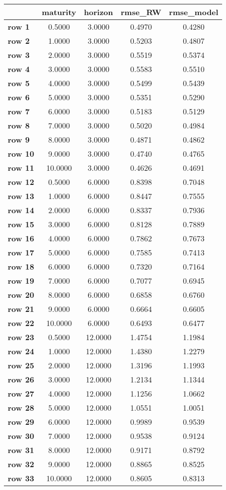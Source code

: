 \begin{tiny}\begin{tabular}{|l|c|c|c|c|}
\hline
&\textbf{maturity}&\textbf{horizon}&\textbf{rmse_RW}&\textbf{rmse_model}\\\hline
\textbf{row 1}&0.5000&3.0000&0.4970&0.4280\\\hline
\textbf{row 2}&1.0000&3.0000&0.5203&0.4807\\\hline
\textbf{row 3}&2.0000&3.0000&0.5519&0.5374\\\hline
\textbf{row 4}&3.0000&3.0000&0.5583&0.5510\\\hline
\textbf{row 5}&4.0000&3.0000&0.5499&0.5439\\\hline
\textbf{row 6}&5.0000&3.0000&0.5351&0.5290\\\hline
\textbf{row 7}&6.0000&3.0000&0.5183&0.5129\\\hline
\textbf{row 8}&7.0000&3.0000&0.5020&0.4984\\\hline
\textbf{row 9}&8.0000&3.0000&0.4871&0.4862\\\hline
\textbf{row 10}&9.0000&3.0000&0.4740&0.4765\\\hline
\textbf{row 11}&10.0000&3.0000&0.4626&0.4691\\\hline
\textbf{row 12}&0.5000&6.0000&0.8398&0.7048\\\hline
\textbf{row 13}&1.0000&6.0000&0.8447&0.7555\\\hline
\textbf{row 14}&2.0000&6.0000&0.8337&0.7936\\\hline
\textbf{row 15}&3.0000&6.0000&0.8128&0.7889\\\hline
\textbf{row 16}&4.0000&6.0000&0.7862&0.7673\\\hline
\textbf{row 17}&5.0000&6.0000&0.7585&0.7413\\\hline
\textbf{row 18}&6.0000&6.0000&0.7320&0.7164\\\hline
\textbf{row 19}&7.0000&6.0000&0.7077&0.6945\\\hline
\textbf{row 20}&8.0000&6.0000&0.6858&0.6760\\\hline
\textbf{row 21}&9.0000&6.0000&0.6664&0.6605\\\hline
\textbf{row 22}&10.0000&6.0000&0.6493&0.6477\\\hline
\textbf{row 23}&0.5000&12.0000&1.4754&1.1984\\\hline
\textbf{row 24}&1.0000&12.0000&1.4380&1.2279\\\hline
\textbf{row 25}&2.0000&12.0000&1.3196&1.1993\\\hline
\textbf{row 26}&3.0000&12.0000&1.2134&1.1344\\\hline
\textbf{row 27}&4.0000&12.0000&1.1256&1.0662\\\hline
\textbf{row 28}&5.0000&12.0000&1.0551&1.0051\\\hline
\textbf{row 29}&6.0000&12.0000&0.9989&0.9539\\\hline
\textbf{row 30}&7.0000&12.0000&0.9538&0.9124\\\hline
\textbf{row 31}&8.0000&12.0000&0.9171&0.8792\\\hline
\textbf{row 32}&9.0000&12.0000&0.8865&0.8525\\\hline
\textbf{row 33}&10.0000&12.0000&0.8605&0.8313\\\hline
\end{tabular}
\end{tiny}
